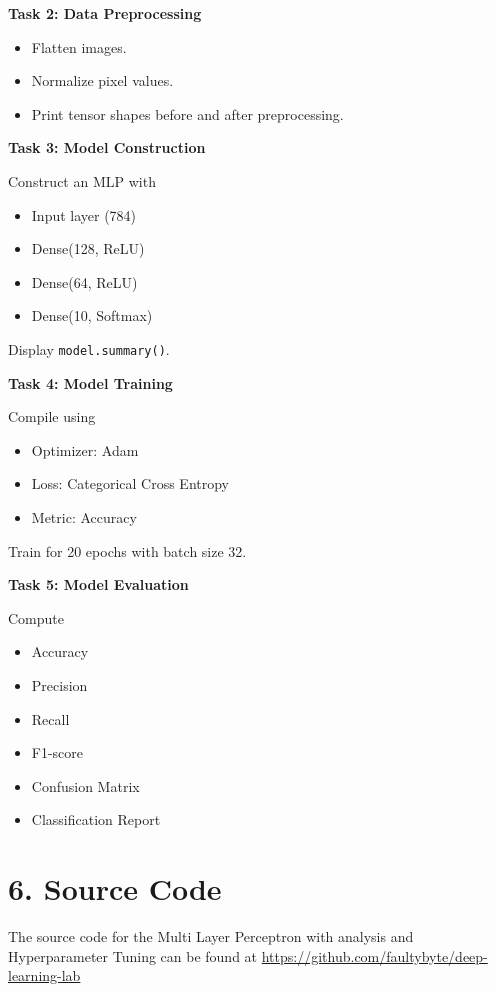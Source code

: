 \documentclass[11pt]{article}
\begin{document}
\bigskip

\textbf{Task 2: Data Preprocessing}

\begin{itemize}
\item Flatten images.
\item Normalize pixel values.
\item Print tensor shapes before and after preprocessing.
\end{itemize}

\bigskip

\textbf{Task 3: Model Construction}

Construct an MLP with

\begin{itemize}
\item Input layer (784)
\item Dense(128, ReLU)
\item Dense(64, ReLU)
\item Dense(10, Softmax)
\end{itemize}

Display \texttt{model.summary()}.

\bigskip

\textbf{Task 4: Model Training}

Compile using

\begin{itemize}
\item Optimizer: Adam
\item Loss: Categorical Cross Entropy
\item Metric: Accuracy
\end{itemize}

Train for 20 epochs with batch size 32.

\bigskip

\textbf{Task 5: Model Evaluation}

Compute

\begin{itemize}
\item Accuracy
\item Precision
\item Recall
\item F1-score
\item Confusion Matrix
\item Classification Report
\end{itemize}

\section*{6. Source Code}
The source code for the Multi Layer Perceptron with analysis and Hyperparameter Tuning can be found at \url{https://github.com/faultybyte/deep-learning-lab}
\end{document}
